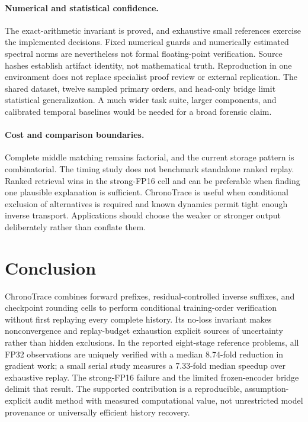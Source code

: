 \paragraph{Numerical and statistical confidence.}
The exact-arithmetic invariant is proved, and exhaustive small references exercise the implemented decisions. Fixed numerical guards and numerically estimated spectral norms are nevertheless not formal floating-point verification. Source hashes establish artifact identity, not mathematical truth. Reproduction in one environment does not replace specialist proof review or external replication. The shared dataset, twelve sampled primary orders, and head-only bridge limit statistical generalization. A much wider task suite, larger components, and calibrated temporal baselines would be needed for a broad forensic claim.

\paragraph{Cost and comparison boundaries.}
Complete middle matching remains factorial, and the current storage pattern is combinatorial. The timing study does not benchmark standalone ranked replay. Ranked retrieval wins in the strong-FP16 cell and can be preferable when finding one plausible explanation is sufficient. ChronoTrace is useful when conditional exclusion of alternatives is required and known dynamics permit tight enough inverse transport. Applications should choose the weaker or stronger output deliberately rather than conflate them.



\section{Conclusion}
ChronoTrace combines forward prefixes, residual-controlled inverse suffixes, and checkpoint rounding cells to perform conditional training-order verification without first replaying every complete history. Its no-loss invariant makes nonconvergence and replay-budget exhaustion explicit sources of uncertainty rather than hidden exclusions. In the reported eight-stage reference problems, all FP32 observations are uniquely verified with a median 8.74-fold reduction in gradient work; a small serial study measures a 7.33-fold median speedup over exhaustive replay. The strong-FP16 failure and the limited frozen-encoder bridge delimit that result. The supported contribution is a reproducible, assumption-explicit audit method with measured computational value, not unrestricted model provenance or universally efficient history recovery.

